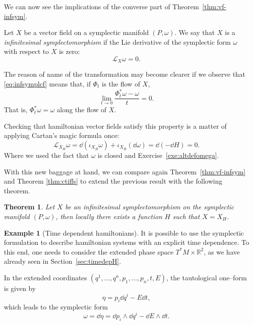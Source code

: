 \documentclass[english,fontsize=11pt,paper=b5]{scrbook}
\newtheorem{theorem}{Theorem}[chapter]
\theoremstyle{definition}
\newtheorem{example}{Example}[chapter]
\begin{document}
    We can now see the implications of the converse part of Theorem~\ref{thm:vf-infsym}.

    \begin{tcolorbox}
      Let $X$ be a vector field on a symplectic manifold $(P,\omega)$.
      We say that $X$ is a \emph{infinitesimal symplectomorphism} if the Lie derivative of the symplectic form $\omega$ with respect to $X$ is zero:
      \begin{equation}\label{eq:infsymplcf}
        \mathcal{L}_X \omega = 0.
      \end{equation}
    \end{tcolorbox}

    The reason of name of the transformation may become clearer if we observe that \eqref{eq:infsymplcf} means that, if $\Phi_t$ is the flow of $X$,
    \begin{equation}
      \lim_{t\to 0} \frac{\Phi_t^*\omega - \omega}{t} = 0.
    \end{equation}
    That is, $\Phi_t^*\omega = \omega$ along the flow of $X$.

    Checking that hamiltonian vector fields satisfy this property is a matter of applying Cartan's magic formula once:
    \begin{equation}
      \mathcal{L}_{X_H} \omega = \dd(\iota_{X_H} \omega) + \iota_{X_H}(\dd \omega)
      = \dd(-\dd H) = 0.
    \end{equation}
    Where we used the fact that $\omega$ is closed and Exercise~\ref{exe:altdefomega}.

    With this new baggage at hand, we can compare again Theorem~\ref{thm:vf-infsym} and Theorem \ref{thm:ctiffs} to extend the previous result with the following theorem.

    \begin{theorem}
      Let $X$ be an infinitesimal symplectomorphism on the symplectic manifold $(P,\omega)$, then locally there exists a function $H$ such that $X = X_H$.
    \end{theorem}


    \begin{example}[Time dependent hamiltonians]\label{ex:timedepH}
      It is possible to use the symplectic formulation to describe hamiltonian systems with an explicit time dependence.
      To this end, one needs to consider the extended phase space $T^*M\times\mathbb{R}^2$, as we have already seen in Section~\ref{sec:timedepH}.

      In the extended coordinates $(q^1, \ldots, q^n, p_1,\ldots,p_n,t,E)$, the tautological one--form is given by
      \begin{equation}
        \eta = p_i\dd q^i -E\dd t,
      \end{equation}
      which leads to the symplectic form
      \begin{equation}
        \omega = \dd\eta = \dd p_i \wedge \dd q^i -\dd E \wedge \dd t.
      \end{equation}
    \end{example}
\end{document}
